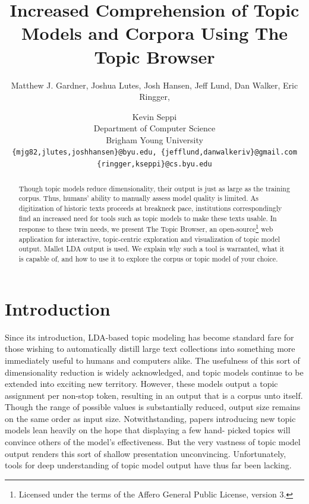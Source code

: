 \documentclass[11pt]{article}
\title{Increased Comprehension of Topic Models and Corpora Using The Topic Browser}
\author{Matthew J. Gardner, Joshua Lutes, Josh Hansen, Jeff Lund, Dan Walker, Eric Ringger, \and Kevin Seppi\\
Department of Computer Science\\
Brigham Young University\\
\tt \{mjg82,jlutes,joshhansen\}@byu.edu, \{jefflund,danwalkeriv\}@gmail.com\\
\tt \{ringger,kseppi\}@cs.byu.edu}
\begin{document}
\maketitle


\begin{abstract}
Though topic models reduce dimensionality, their output is just as large as the training corpus.
Thus, humans' ability to manually assess model quality is limited. As digitization of historic texts
proceeds at breakneck pace, institutions correspondingly find an increased need for tools such as
topic models to make these texts usable. In response to these twin needs, we present The Topic Browser,
an open-source\footnote{Licensed under the terms of the
Affero General Public License, version 3.} web application for interactive, topic-centric
exploration and visualization of topic model output. Mallet LDA output is used.
We explain why such a tool is warranted, what it is capable of, and
how to use it to explore the corpus or topic model of your choice.
\end{abstract}

\section{Introduction}
Since its introduction, LDA-based topic modeling \cite{blei_latent_2003} has become standard fare for those wishing to automatically distill large text collections into something more immediately useful to humans and computers alike. The usefulness of this sort of dimensionality reduction is widely acknowledged, and topic models continue to be extended into exciting new territory. \cite{wang_continuous_2008,mimno_polylingual_2009,boyd-graber_holistic_2010,brody_unsupervised_2010,he_detecting_2009,yao_efficient_2009} However, these models output a topic assignment per non-stop token, resulting in an output that is a
corpus unto itself. Though the range of possible values is substantially reduced,
output size remains on the same order as input size. Notwithstanding, papers
introducing new topic models lean heavily on the hope that displaying a few hand-
picked topics will convince others of the model's effectiveness. But the very
vastness of topic model output renders this sort of shallow presentation
unconvincing. Unfortunately, tools for deep understanding of topic model output
have thus far been lacking.
\end{document}
